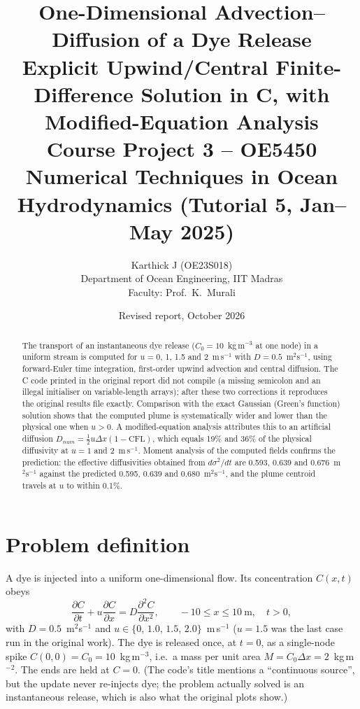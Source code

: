 
\title{\textbf{One-Dimensional Advection--Diffusion of a Dye Release}\\[2pt]\large Explicit Upwind/Central Finite-Difference Solution in C, with Modified-Equation Analysis\\[2pt]\normalsize Course Project 3 -- OE5450 Numerical Techniques in Ocean Hydrodynamics (Tutorial 5, Jan--May 2025)}
\author{Karthick J (OE23S018)\\Department of Ocean Engineering, IIT Madras\\Faculty: Prof.\ K.\ Murali}
\date{Revised report, October 2026}
\maketitle
\begin{abstract}
The transport of an instantaneous dye release ($C_0=10$~kg\,m$^{-3}$ at one node) in a uniform stream is computed for $u=0$, 1, 1.5 and 2~m\,s$^{-1}$ with $D=0.5$~m$^2$s$^{-1}$, using forward-Euler time integration, first-order upwind advection and central diffusion. The C code printed in the original report did not compile (a missing semicolon and an illegal initialiser on variable-length arrays); after these two corrections it reproduces the original results file exactly. Comparison with the exact Gaussian (Green's function) solution shows that the computed plume is systematically wider and lower than the physical one when $u>0$. A modified-equation analysis attributes this to an artificial diffusion $D_{num}=\tfrac12u\Delta x(1-\mathrm{CFL})$, which equals 19\% and 36\% of the physical diffusivity at $u=1$ and 2~m\,s$^{-1}$. Moment analysis of the computed fields confirms the prediction: the effective diffusivities obtained from $d\sigma^2/dt$ are 0.593, 0.639 and 0.676~m$^2$s$^{-1}$ against the predicted 0.595, 0.639 and 0.680~m$^2$s$^{-1}$, and the plume centroid travels at $u$ to within 0.1\%.
\end{abstract}
\tableofcontents\newpage

\section{Problem definition}
A dye is injected into a uniform one-dimensional flow. Its concentration $C(x,t)$ obeys
\begin{equation}
\frac{\partial C}{\partial t}+u\frac{\partial C}{\partial x}=D\frac{\partial^2 C}{\partial x^2},\qquad -10\le x\le10~\mathrm{m},\quad t>0, \label{eq:ad}
\end{equation}
with $D=0.5$~m$^2$s$^{-1}$ and $u\in\{0,\,1.0,\,1.5,\,2.0\}$~m\,s$^{-1}$ ($u=1.5$ was the last case run in the original work). The dye is released once, at $t=0$, as a single-node spike $C(0,0)=C_0=10$~kg\,m$^{-3}$, i.e.\ a mass per unit area $M=C_0\Delta x=2$~kg\,m$^{-2}$. The ends are held at $C=0$. (The code's title mentions a ``continuous source'', but the update never re-injects dye; the problem actually solved is an instantaneous release, which is also what the original plots show.)

